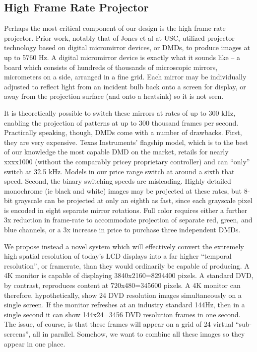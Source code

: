 \documentclass[12pt]{article}
\begin{document}
\subsection{High Frame Rate Projector}
Perhaps the most critical component of our design is the high frame rate projector. Prior work, notably that of Jones et al at USC, utilized projector technology based on digital micromirror devices, or DMDs, to produce images at up to 5760 Hz. A digital micromirror device is exactly what it sounds like – a board which consists of hundreds of thousands of microscopic mirrors, micrometers on a side, arranged in a fine grid. Each mirror may be individually adjusted to reflect light from an incident bulb back onto a screen for display, or away from the projection surface (and onto a heatsink) so it is not seen.

It is theoretically possible to switch these mirrors at rates of up to 300 kHz, enabling the projection of patterns at up to 300 thousand frames per second. Practically speaking, though, DMDs come with a number of drawbacks. First, they are very expensive. Texas Instruments’ flagship model, which is to the best of our knowledge the most capable DMD on the market, retails for nearly xxxx1000 (without the comparably pricey proprietary controller) and can “only” switch at 32.5 kHz. Models in our price range switch at around a sixth that speed. Second, the binary switching speeds are misleading. Highly detailed monochrome (ie black and white) images may be projected at these rates, but 8-bit grayscale can be projected at only an eighth as fast, since each grayscale pixel is encoded in eight separate mirror rotations. Full color requires either a further 3x reduction in frame-rate to accommodate projection of separate red, green, and blue channels, or a 3x increase in price to purchase three independent DMDs.

We propose instead a novel system which will effectively convert the extremely high spatial resolution of today’s LCD displays into a far higher “temporal resolution”, or framerate, than they would ordinarily be capable of producing. A 4K monitor is capable of displaying 3840x2160=8294400 pixels. A standard DVD, by contrast, reproduces content at 720x480=345600 pixels. A 4K monitor can therefore, hypothetically, show 24 DVD resolution images simultaneously on a single screen. If the monitor refreshes at an industry standard 144Hz, then in a single second it can show 144x24=3456 DVD resolution frames in one second. The issue, of course, is that these frames will appear on a grid of 24 virtual “sub-screens”, all in parallel. Somehow, we want to combine all these images so they appear in one place.
\end{document}
